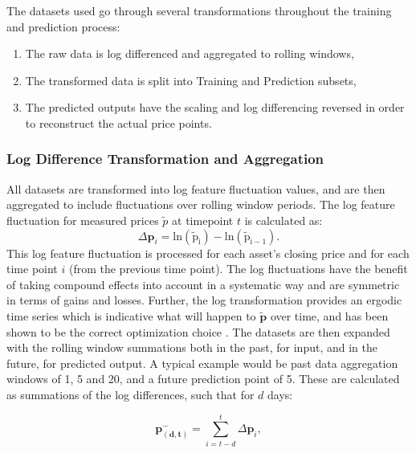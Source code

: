 \documentclass[a4paper,11pt,oneside]{article}
\theoremstyle{plain}
\theoremstyle{definition}
\begin{document}
	The datasets used go through several transformations throughout the training and prediction process:
	
	\begin{enumerate}
		\item The raw data is log differenced and aggregated to rolling windows,
		\item The transformed data is split into Training and Prediction subsets,
		\item The predicted outputs have the scaling and log differencing reversed in order to reconstruct the actual price points.
	\end{enumerate}
		
	\subsubsection{Log Difference Transformation and Aggregation}\label{ldata_og_difference}
	All datasets are transformed into log feature fluctuation values, and are then aggregated to include fluctuations over rolling window periods. The log feature fluctuation for measured prices $\tilde{p}$ at timepoint $t$ is calculated as:
	\begin{equation}\label{eq_logdiff}
	\Delta\mathbf{p}_i = \mathrm{ln(\tilde{p}_i) - \mathrm{ln}(\tilde{p}_{i-1})} .
	\end{equation}
	This log feature fluctuation is processed for each asset's closing price and for each time point $i$ (from the previous time point). The log fluctuations have the benefit of taking compound effects into account in a systematic way and are symmetric in terms of gains and losses. Further, the log transformation provides an ergodic time series which is indicative what will happen to $\mathbf{\tilde{p}}$ over time, and has been shown to be the correct optimization choice \citep{Peters}.
	\newline\newline
	The datasets are then expanded with the rolling window summations both in the past, for input, and in the future, for predicted output. A typical example would be past data aggregation windows of 1, 5 and 20, and a future prediction point of 5. These are calculated as summations of the log differences, such that for $d$ days:
	
	\begin{equation}\label{eq_price_agg_past}
	 \mathbf{p^{-}_{(d,t)}} = \sum_{i = t-d}^{t} \Delta\mathbf{p}_i , 
	\end{equation}
	
\end{document}
